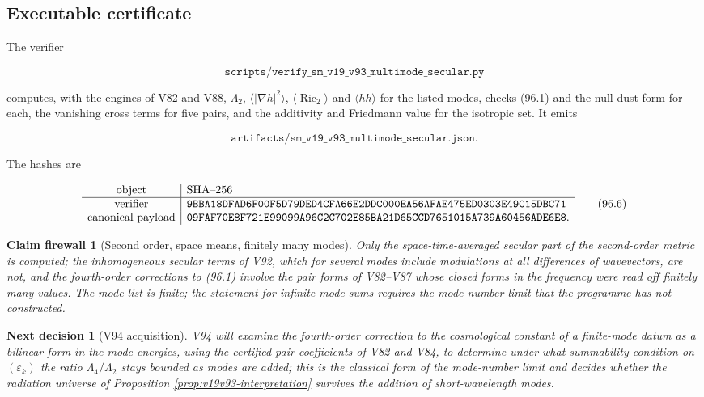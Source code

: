 \documentclass[11pt]{article}
\newtheorem{firewall}[theorem]{Claim firewall}
\newtheorem{decision}[theorem]{Next decision}
\theoremstyle{remark}
\begin{document}
\subsection{Executable certificate}

The verifier

\[
 \texttt{scripts/verify\_sm\_v19\_v93\_multimode\_secular.py}        \tag{96.4}
\]

computes, with the engines of V82 and V88, \(\Lambda_2\),
\(\langle|\nabla h|^2\rangle\), \(\langle\operatorname{Ric}_2\rangle\) and
\(\langle hh\rangle\) for the listed modes, checks (96.1) and the
null-dust form for each, the vanishing cross terms for five pairs, and
the additivity and Friedmann value for the isotropic set.  It emits

\[
 \texttt{artifacts/sm\_v19\_v93\_multimode\_secular.json}.           \tag{96.5}
\]

The hashes are

\[
\begin{array}{c|l}
\hbox{object}&\hbox{SHA--256}\\ \hline
\hbox{verifier}&
\texttt{9BBA18DFAD6F00F5D79DED4CFA66E2DDC000EA56AFAE475ED0303E49C15DBC71}\\
\hbox{canonical payload}&
\texttt{09FAF70E8F721E99099A96C2C702E85BA21D65CCD7651015A739A60456ADE6E8}.
\end{array}                                                     \tag{96.6}
\]

\begin{firewall}[Second order, space means, finitely many modes]
\label{fire:v19v93}
Only the space-time-averaged secular part of the second-order metric
is computed; the inhomogeneous secular terms of V92, which for
several modes include modulations at all differences of wavevectors,
are not, and the fourth-order corrections to (96.1) involve the pair
forms of V82--V87 whose closed forms in the frequency were read off
finitely many values.  The mode list is finite; the statement for
infinite mode sums requires the mode-number limit that the programme
has not constructed.
\end{firewall}

\begin{decision}[V94 acquisition]
\label{dec:v19v93-next}
V94 will examine the fourth-order correction to the cosmological
constant of a finite-mode datum as a bilinear form in the mode
energies, using the certified pair coefficients of V82 and V84, to
determine under what summability condition on \((\varepsilon_k)\) the
ratio \(\Lambda_4/\Lambda_2\) stays bounded as modes are added; this
is the classical form of the mode-number limit and decides whether
the radiation universe of Proposition
\ref{prop:v19v93-interpretation} survives the addition of
short-wavelength modes.
\end{decision}
\end{document}
